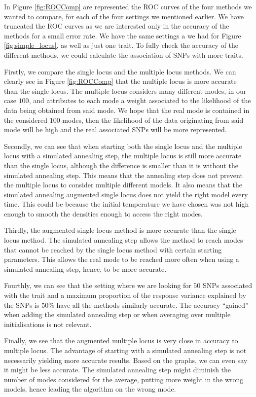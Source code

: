 \documentclass[a4paper, 11pt]{report}
\numberwithin{equation}{chapter}
\begin{document}
In Figure \ref{fig:ROCComp} are represented the ROC curves of the four methods we wanted to compare, for each of the four settings we mentioned earlier. We have truncated the ROC curves as we are interested only in the accuracy of the methods for a small error rate. We have the same settings a we had for Figure \ref{fig:simple_locus}, as well as just one trait. To fully check the accuracy of the different methods, we could calculate the association of SNPs with more traits.

Firstly, we compare the single locus and the multiple locus methods. We can clearly see in Figure \ref{fig:ROCComp} that the multiple locus is more accurate than the single locus. The multiple locus considers many different modes, in our case $100$, and attributes to each mode a weight associated to the likelihood of the data being obtained from said mode. We hope that the real mode is contained in the considered $100$ modes, then the likelihood of the data originating from said mode will be high and the real associated SNPs will be more represented.

Secondly, we can see that when starting both the single locus and the multiple locus with a simulated annealing step, the multiple locus is still more accurate than the single locus, although the difference is smaller than it is without the simulated annealing step. This means that the annealing step does not prevent the multiple locus to consider multiple different models. It also means that the simulated annealing augmented single locus does not yield the right model every time. This could be because the initial temperature we have chosen was not high enough to smooth the densities enough to access the right modes.

Thirdly, the augmented single locus method is more accurate than the single locus method. The simulated annealing step allows the method to reach modes that cannot be reached by the single locus method with certain starting parameters. This allows the real mode to be reached more often when using a simulated annealing step, hence, to be more accurate.

Fourthly, we can see that the setting where we are looking for $50$ SNPs associated with the trait and a maximum proportion of the response variance explained by the SNPs is $50\%$ have all the methods similarly accurate. The accuracy ``gained'' when adding the simulated annealing step or when averaging over multiple initialisations is not relevant. 

Finally, we see that the augmented multiple locus is very close in accuracy to multiple locus. The advantage of starting with a simulated annealing step is not necessarily yielding more accurate results. Based on the graphs, we can even say it might be less accurate. The simulated annealing step might diminish the number of modes considered for the average, putting more weight in the wrong models, hence leading the algorithm on the wrong mode.
\end{document}
